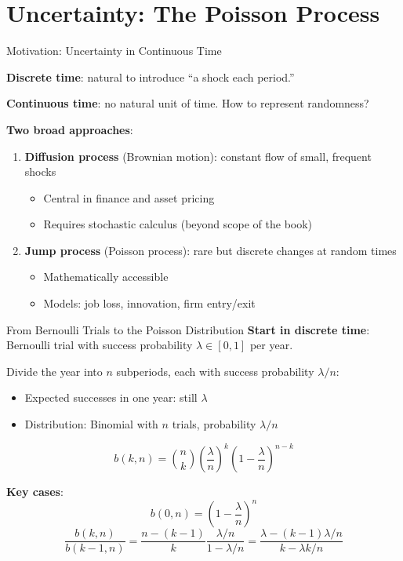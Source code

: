 \documentclass[blue]{beamer}
\begin{document}
\section{Uncertainty: The Poisson Process}

\begin{frame}{Motivation: Uncertainty in Continuous Time}

	\textbf{Discrete time}: natural to introduce ``a shock each period.''
	
	\textbf{Continuous time}: no natural unit of time. How to represent randomness?
	

	\textbf{Two broad approaches}:
	\begin{enumerate}
		\item \textbf{Diffusion process} (Brownian motion): constant flow of small, frequent shocks
		\begin{itemize}
			\item Central in finance and asset pricing
			\item Requires stochastic calculus (beyond scope of the book)
		\end{itemize}
		\item \textbf{Jump process} (Poisson process): rare but discrete changes at random times
		\begin{itemize}
			\item Mathematically accessible
			\item Models: job loss, innovation, firm entry/exit
		
		\end{itemize}
	\end{enumerate}
\end{frame}

\begin{frame}{From Bernoulli Trials to the Poisson Distribution}
	\textbf{Start in discrete time}: Bernoulli trial with success probability $\lambda \in [0,1]$ per year.
	
	\bigskip
	Divide the year into $n$ subperiods, each with success probability $\lambda/n$:
	\begin{itemize}
		\item Expected successes in one year: still $\lambda$
		\item Distribution: Binomial with $n$ trials, probability $\lambda/n$
	\end{itemize}
	\[
	b(k, n) = \binom{n}{k} \left(\frac{\lambda}{n}\right)^k \left(1-\frac{\lambda}{n}\right)^{n-k}
	\]
	
	\textbf{Key cases}:
	\[
	b(0, n) = \left(1-\frac{\lambda}{n}\right)^n 
	\]
	\[\frac{b(k,n)}{b(k-1,n)} = \frac{n-(k-1)}{k} \frac{\lambda/n}{1-\lambda/n} = \frac{\lambda-(k-1)\lambda/n}{k-\lambda k/n}
	\]
\end{frame}
\end{document}
